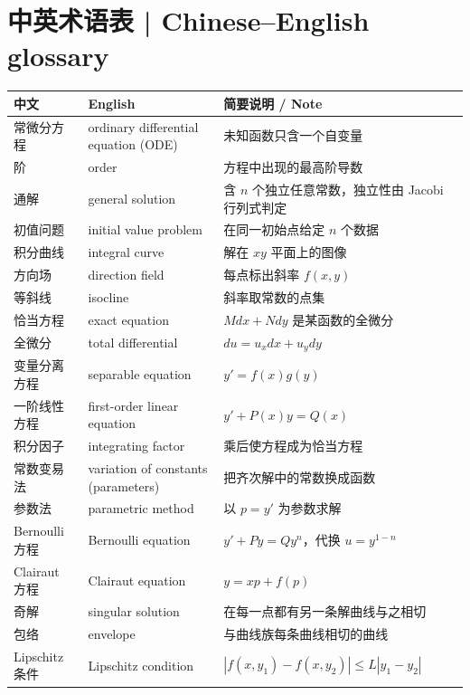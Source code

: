\documentclass[UTF8,11pt,a4paper]{ctexart}
\begin{document}
\section*{中英术语表 | Chinese--English glossary}
\noindent\footnotesize\renewcommand{\arraystretch}{0.94}
\begin{longtable}{@{}>{\raggedright\arraybackslash}p{2.9cm}>{\raggedright\arraybackslash}p{4.7cm}>{\raggedright\arraybackslash}p{7.0cm}@{}}
\toprule
\textbf{中文} & \textbf{English} & \textbf{简要说明 / Note} \\
\midrule
\endhead
常微分方程 & ordinary differential equation (ODE) & 未知函数只含一个自变量 \\
\hline
阶 & order & 方程中出现的最高阶导数 \\
\hline
通解 & general solution & 含 $n$ 个独立任意常数，独立性由 Jacobi 行列式判定 \\
\hline
初值问题 & initial value problem & 在同一初始点给定 $n$ 个数据 \\
\hline
积分曲线 & integral curve & 解在 $xy$ 平面上的图像 \\
\hline
方向场 & direction field & 每点标出斜率 $f(x,y)$ \\
\hline
等斜线 & isocline & 斜率取常数的点集 \\
\hline
恰当方程 & exact equation & $Mdx+Ndy$ 是某函数的全微分 \\
全微分 & total differential & $du=u_xdx+u_ydy$ \\
\hline
\hline
变量分离方程 & separable equation & $y'=f(x)g(y)$ \\
\hline
一阶线性方程 & first-order linear equation & $y'+P(x)y=Q(x)$ \\
\hline
积分因子 & integrating factor & 乘后使方程成为恰当方程 \\
\hline
常数变易法 & variation of constants (parameters) & 把齐次解中的常数换成函数 \\
参数法 & parametric method & 以 $p=y'$ 为参数求解 \\
\hline
\hline
Bernoulli 方程 & Bernoulli equation & $y'+Py=Qy^n$，代换 $u=y^{1-n}$ \\
\hline
Clairaut 方程 & Clairaut equation & $y=xp+f(p)$ \\
\hline
奇解 & singular solution & 在每一点都有另一条解曲线与之相切 \\
\hline
包络 & envelope & 与曲线族每条曲线相切的曲线 \\
\hline
Lipschitz 条件 & Lipschitz condition & $|f(x,y_1)-f(x,y_2)|\le L|y_1-y_2|$ \\
\hline

\end{longtable}
\end{document}
